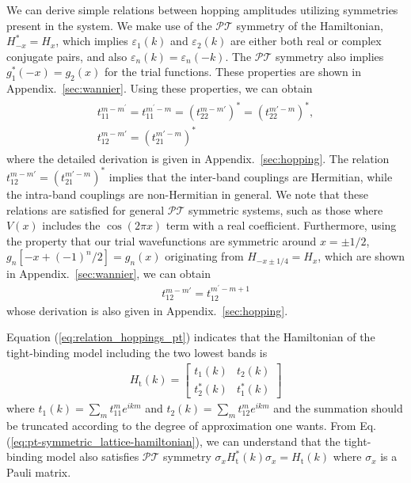 \documentclass[prb,superscriptaddress,floatfix,twocolumn,showpacs]{revtex4-2}
\begin{document}
We can derive simple relations between hopping amplitudes utilizing symmetries present in the system. We make use of the $\mathcal{PT}$ symmetry of the Hamiltonian, $H_{-x}^\ast = H_{x}$, which implies $\varepsilon_1 (k)$ and $\varepsilon_2 (k)$ are either both real or complex conjugate pairs, and also $\varepsilon_n(k)=\varepsilon_n(-k)$. 
The $\mathcal{PT}$ symmetry also implies $g_1^* (-x) = g_2 (x)$ for the trial functions.
These properties are shown in Appendix.~\ref{sec:wannier}.
Using these properties, we can obtain
\begin{align}
    \begin{array}{cc}
    t^{m-m^\prime}_{11} = t^{m^\prime - m}_{11} = (t^{m-m'}_{22})^* =(t^{m'-m}_{22})^*,\\
    t^{m-m'}_{12} =(t^{m'-m}_{21})^\ast
    \end{array}
    \label{eq:relation_hoppings_pt}
\end{align}
where the detailed derivation is given in Appendix.~\ref{sec:hopping}. 
The relation $t^{m-m'}_{12} =(t^{m'-m}_{21})^\ast$ implies that the inter-band couplings are Hermitian, while the intra-band couplings are non-Hermitian in general. 
We note that these relations are satisfied for general $\mathcal{PT}$ symmetric systems, such as those where $V(x)$ includes the $\cos(2\pi x)$ term with a real coefficient. 
Furthermore, using the property that our trial wavefunctions are symmetric around $x=\pm1/2$, $g_n[-x+(-1)^n/2]=g_n(x)$ originating from $H_{-x\pm1/4}=H_x$, which are shown in Appendix.~\ref{sec:wannier}, we can obtain
\begin{align}
    t^{m-m'}_{12} = t_{12}^{m^\prime - m +1}
    \label{eq:relation_hoppings_pm1/4}
\end{align}
whose derivation is also given in Appendix.~\ref{sec:hopping}. 

Equation (\ref{eq:relation_hoppings_pt}) indicates that the Hamiltonian of the tight-binding model including the two lowest bands is
\begin{align}
    H_\text{t}(k)=\left[\begin{array}{cc}
        t_1(k) & t_2(k) \\
        t_2^\ast(k) & t_1^\ast(k)
    \end{array}\right]
    \label{eq:pt-symmetric_lattice-hamiltonian}
\end{align}
where $t_1(k)=\sum_mt^m_{11}e^{ikm}$ and $t_2(k)=\sum_mt^m_{12}e^{ikm}$ and the summation should be truncated according to the degree of approximation one wants.
From Eq. (\ref{eq:pt-symmetric_lattice-hamiltonian}), we can understand that the tight-binding model also satisfies $\mathcal{PT}$ symmetry $\sigma_xH_\text{t}^\ast(k)\sigma_x=H_\text{t}(k)$ where $\sigma_x$ is a Pauli matrix.
\end{document}
